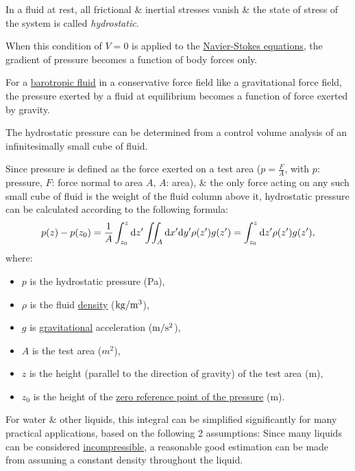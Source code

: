 \documentclass{article}
\begin{document}
%
In a fluid at rest, all frictional \& inertial stresses vanish \& the state of stress of the system is called {\it hydrostatic}.

When this condition of $V = 0$ is applied to the \href{https://en.wikipedia.org/wiki/Navier-Stokes_equations}{Navier-Stokes equations}, the gradient of pressure becomes a function of body forces only.

For a \href{https://en.wikipedia.org/wiki/Barotropic_fluid}{barotropic fluid} in a conservative force field like a gravitational force field, the pressure exerted by a fluid at equilibrium becomes a function of force exerted by gravity.

%
The hydrostatic pressure can be determined from a control volume analysis of an infinitesimally small cube of fluid.

Since pressure is defined as the force exerted on a test area ($p = \frac{F}{A}$, with $p$: pressure, $F$: force normal to area $A$, $A$: area), \& the only force acting on any such small cube of fluid is the weight of the fluid column above it, hydrostatic pressure can be calculated according to the following formula:
\begin{align*}
	p(z) - p(z_0) = \frac{1}{A}\int_{z_0}^z {\rm d}z'\iint_A {\rm d}x'{\rm d}y'\rho(z')g(z') = \int_{z_0}^z {\rm d}z'\rho(z')g(z'),
\end{align*}
where:
\begin{itemize}
	\item $p$ is the hydrostatic pressure (Pa),
	\item $\rho$ is the fluid \href{https://en.wikipedia.org/wiki/Density}{density} ($\rm kg/m^3$),
	\item $g$ is \href{https://en.wikipedia.org/wiki/Gravity}{gravitational} acceleration ($\rm m/s^2$),
	\item $A$ is the test area ($m^2$),
	\item $z$ is the height (parallel to the direction of gravity) of the test area (m),
	\item $z_0$ is the height of the \href{https://en.wikipedia.org/wiki/Pressure_measurement#Absolute,_gauge_and_differential_pressures_-_zero_reference}{zero reference point of the pressure} (m).
\end{itemize}
For water \& other liquids, this integral can be simplified significantly for many practical applications, based on the following 2 assumptions: Since many liquids can be considered \href{https://en.wikipedia.org/wiki/Incompressible}{incompressible}, a reasonable good estimation can be made from assuming a constant density throughout the liquid.
\end{document}
